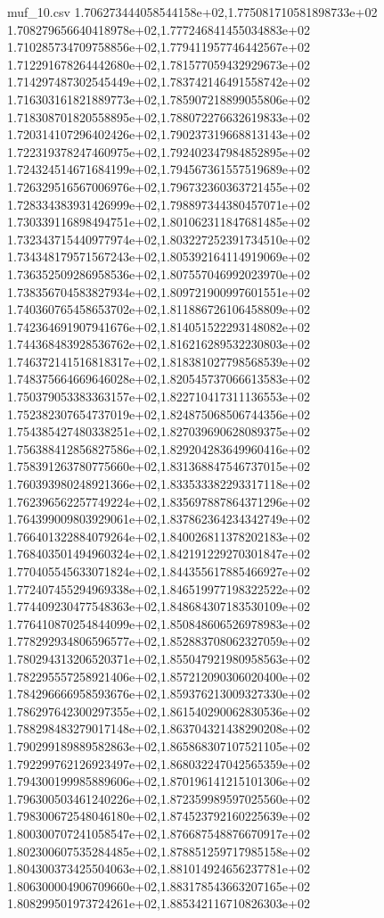 \begin{filecontents*}{muf_10.csv}
1.706273444058544158e+02,1.775081710581898733e+02
1.708279656640418978e+02,1.777246841455034883e+02
1.710285734709758856e+02,1.779411957746442567e+02
1.712291678264442680e+02,1.781577059432929673e+02
1.714297487302545449e+02,1.783742146491558742e+02
1.716303161821889773e+02,1.785907218899055806e+02
1.718308701820558895e+02,1.788072276632619833e+02
1.720314107296402426e+02,1.790237319668813143e+02
1.722319378247460975e+02,1.792402347984852895e+02
1.724324514671684199e+02,1.794567361557519689e+02
1.726329516567006976e+02,1.796732360363721455e+02
1.728334383931426999e+02,1.798897344380457071e+02
1.730339116898494751e+02,1.801062311847681485e+02
1.732343715440977974e+02,1.803227252391734510e+02
1.734348179571567243e+02,1.805392164114919069e+02
1.736352509286958536e+02,1.807557046992023970e+02
1.738356704583827934e+02,1.809721900997601551e+02
1.740360765458653702e+02,1.811886726106458809e+02
1.742364691907941676e+02,1.814051522293148082e+02
1.744368483928536762e+02,1.816216289532230803e+02
1.746372141516818317e+02,1.818381027798568539e+02
1.748375664669646028e+02,1.820545737066613583e+02
1.750379053383363157e+02,1.822710417311136553e+02
1.752382307654737019e+02,1.824875068506744356e+02
1.754385427480338251e+02,1.827039690628089375e+02
1.756388412856827586e+02,1.829204283649960416e+02
1.758391263780775660e+02,1.831368847546737015e+02
1.760393980248921366e+02,1.833533382293317118e+02
1.762396562257749224e+02,1.835697887864371296e+02
1.764399009803929061e+02,1.837862364234342749e+02
1.766401322884079264e+02,1.840026811378202183e+02
1.768403501494960324e+02,1.842191229270301847e+02
1.770405545633071824e+02,1.844355617885466927e+02
1.772407455294969338e+02,1.846519977198322522e+02
1.774409230477548363e+02,1.848684307183530109e+02
1.776410870254844099e+02,1.850848606526978983e+02
1.778292934806596577e+02,1.852883708062327059e+02
1.780294313206520371e+02,1.855047921980958563e+02
1.782295557258921406e+02,1.857212090306020400e+02
1.784296666958593676e+02,1.859376213009327330e+02
1.786297642300297355e+02,1.861540290062830536e+02
1.788298483279017148e+02,1.863704321438290208e+02
1.790299189889582863e+02,1.865868307107521105e+02
1.792299762126923497e+02,1.868032247042565359e+02
1.794300199985889606e+02,1.870196141215101306e+02
1.796300503461240226e+02,1.872359989597025560e+02
1.798300672548046180e+02,1.874523792160225639e+02
1.800300707241058547e+02,1.876687548876670917e+02
1.802300607535284485e+02,1.878851259717985158e+02
1.804300373425504063e+02,1.881014924656237781e+02
1.806300004906709660e+02,1.883178543663207165e+02
1.808299501973724261e+02,1.885342116710826303e+02

\end{filecontents*}
